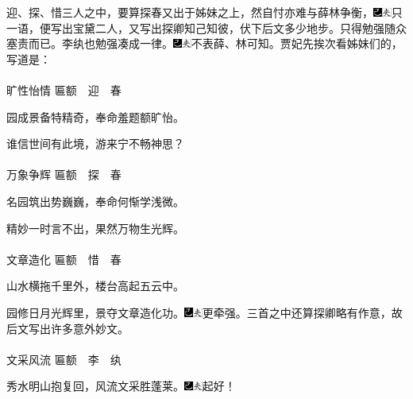 迎、探、惜三人之中，要算探春又出于姊妹之上，然自忖亦难与薛林争衡，{\includegraphics[width=3mm]{../Images/00003}\includegraphics[width=3mm]{../Images/00012}\footnotesize \kaishu 只一语，便写出宝黛二人，又写出探卿知己知彼，伏下后文多少地步。}只得勉强随众塞责而已。李纨也勉强凑成一律。{\includegraphics[width=3mm]{../Images/00003}\includegraphics[width=3mm]{../Images/00012}\footnotesize \kaishu 不表薛、林可知。}贾妃先挨次看姊妹们的，写道是：
\\
\\
\indent
旷性怡情 {\small 匾额}　迎　春

园成景备特精奇，奉命羞题额旷怡。

谁信世间有此境，游来宁不畅神思？
\\
\\
\indent
万象争辉 {\small 匾额}　探　春

名园筑出势巍巍，奉命何惭学浅微。

精妙一时言不出，果然万物生光辉。
\\
\\
\indent
文章造化 {\small 匾额}　惜　春

山水横拖千里外，楼台高起五云中。

园修日月光辉里，景夺文章造化功。{\includegraphics[width=3mm]{../Images/00003}\includegraphics[width=3mm]{../Images/00012}\footnotesize \kaishu 更牵强。三首之中还算探卿略有作意，故后文写出许多意外妙文。}
\\
\\
\indent
文采风流 {\small 匾额}　李　纨

秀水明山抱复回，风流文采胜蓬莱。{\includegraphics[width=3mm]{../Images/00003}\includegraphics[width=3mm]{../Images/00012}\footnotesize \kaishu 起好！}


